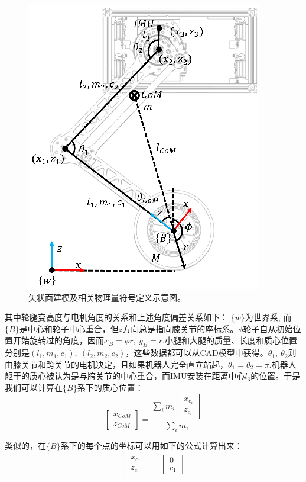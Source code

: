 \begin{figure}
  \centering
  \includegraphics[width=0.5\linewidth]{figures/Sec4/frame.png}
  \caption{
  矢状面建模及相关物理量符号定义示意图。
  }
  \label{fig:sec4-frame}
   \vspace{6pt}
\end{figure}

其中轮腿变高度与电机角度的关系和上述角度偏差关系如下：
$\{w\}$为世界系, 而$\{B\}$是中心和轮子中心重合，但$z$方向总是指向膝关节的座标系。$\phi$轮子自从初始位置开始旋转过的角度，因而$x_B = \phi r,\ y_B = r$.小腿和大腿的质量、长度和质心位置分别是$(l_1,m_1,c_1),\ (l_2,m_2,c_2)$，这些数据都可以从CAD模型中获得。$\theta_1,\ \theta_2$则由膝关节和跨关节的电机决定，且如果机器人完全直立站起，$\theta_1 = \theta_2 = \pi$.机器人躯干的质心被认为是与胯关节的中心重合，而IMU安装在距离中心$l_3$的位置。于是我们可以计算在$\{B\}$系下的质心位置：
\begin{equation}
\begin{bmatrix}
    x_{CoM} \\
    z_{CoM}
\end{bmatrix}
=
\frac{
\sum_i^{} m_i
\begin{bmatrix}
    x_{c_i} \\
    z_{c_i}
\end{bmatrix}
}{\sum_i^{} m_i}
\label{eq:com_calc}
\end{equation}

类似的，在$\{B\}$系下的每个点的坐标可以用如下的公式计算出来：
\begin{equation}
\begin{bmatrix}
    x_{c_1} \\
    z_{c_1}
\end{bmatrix}
=
\begin{bmatrix}
    0 \\
    c_1
\end{bmatrix}
    \label{eq:kine_c1}
\end{equation}

